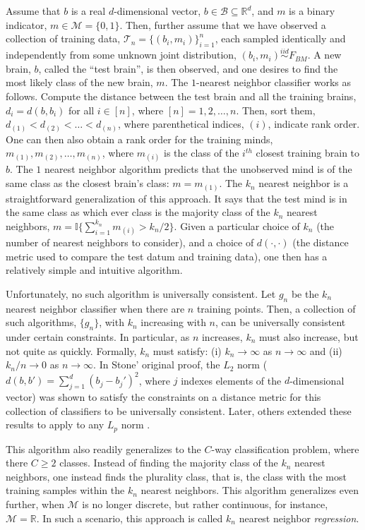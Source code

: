 \documentclass{article}
\newcommand{\conv}{\rightarrow}
\newcommand{\II}{\mathbb{I}}           %
\newcommand{\Real}{\mathbb{R}}           %
\providecommand{\mc}[1]{\mathcal{#1}}
\begin{document}
Assume that $b$ is a real $d$-dimensional vector, $b \in \mc{B} \subseteq \Real^d$, and $m$ is a binary indicator, $m \in \mc{M} = \{0,1\}$.  Then, further assume that we have observed a collection of training data, $\mc{T}_n =\{(b_i,m_i)\}_{i=1}^n$, each sampled identically and independently from some unknown joint distribution, $(b_i,m_i)\overset{iid}{\sim} F_{BM}$.  A new brain, $b$, called the ``test brain'', is then observed, and one desires to find the most likely class of the new brain, $m$.  The $1$-nearest neighbor classifier works as follows.  Compute the distance between the test brain and all the training brains, $d_i=d(b,b_i)$ for all $i \in [n]$, where $[n]=1,2,\ldots, n$.  Then, sort them, $d_{(1)} < d_{(2)} < \ldots < d_{(n)}$, where parenthetical indices, $(i)$, indicate rank order.  One can then also obtain a rank order for the training minds, $m_{(1)}, m_{(2)}, \ldots, m_{(n)}$, where $m_{(i)}$ is the class of the $i^{th}$ closest training brain to $b$.  The $1$ nearest neighbor algorithm predicts that the unobserved mind is of the same class as the closest brain's class: $m=m_{(1)}$.  The $k_n$ nearest neighbor is a straightforward generalization of this approach.  It says that the test mind is in the same class as which ever class is the majority class of the $k_n$ nearest neighbors, $m=\II\{\sum_{i=1}^{k_n} m_{(i)} > k_n/2\}$.  Given a particular choice of $k_n$ (the number of nearest neighbors to consider), and a choice of $d(\cdot,\cdot)$ (the distance metric used to compare the test datum and training data), one then has a relatively simple and intuitive algorithm.  

Unfortunately, no such algorithm is universally consistent.  Let $g_n$ be the $k_n$ nearest neighbor classifier when there are $n$ training points.  Then, a collection of such algorithms, $\{g_n\}$,  with $k_n$ increasing with $n$, can be universally consistent under certain constraints. In particular, as $n$ increases, $k_n$ must also increase, but not quite as quickly.  Formally, $k_n$ must satisfy: (i) $k_n \conv \infty$ as $n \conv \infty$ and (ii) $k_n/n \conv 0$ as $n\conv\infty$. In Stone' original proof, the $L_2$ norm ($d(b,b')=\sum_{j=1}^d (b_j-b_j')^2$, where $j$ indexes elements of the $d$-dimensional vector) was shown to satisfy the constraints on a distance metric for this collection of classifiers to be universally consistent.  Later, others extended these results to apply to any $L_p$ norm \cite{DGL96}.

This algorithm also readily generalizes to the $C$-way classification problem, where there $C \geq 2$ classes.  Instead of finding the majority class of the $k_n$ nearest neighbors, one instead finds the plurality class, that is, the class with the most training samples within the $k_n$ nearest neighbors.  This algorithm generalizes even further, when $\mc{M}$ is no longer discrete, but rather continuous, for instance, $\mc{M}=\Real$.  In such a scenario, this approach is called $k_n$ nearest neighbor \emph{regression}.
\end{document}
